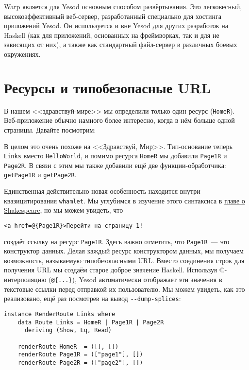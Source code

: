 Warp является для Yesod основным способом развёртывания. Это легковесный,
высокоэффективный веб-сервер, разработанный специально для хостинга приложений Yesod. Он
используется и вне Yesod для других разработок на Haskell (как для приложений, основанных
на фреймворках, так и для не зависящих от них), а также как стандартный файл-сервер в
различных боевых окружениях.

\section{Ресурсы и типобезопасные URL}

В нашем <<здравствуй-мире>> мы определили только один ресурс
(\lstinline!HomeR!). Веб-приложение обычно намного более интересно, когда в нём больше
одной страницы. Давайте посмотрим:

В целом это очень похоже на <<Здравствуй, Мир>>. Тип-основание теперь \lstinline!Links!
вместо \lstinline!HelloWorld!, и помимо ресурса \lstinline!HomeR! мы добавили
\lstinline!Page1R! и \lstinline!Page2R!. В связи с этим мы также добавили ещё две
функции-обработчика: \lstinline!getPage1R! и \lstinline!getPage2R!.

Единственная действительно новая особенность находится внутри квазицитирования
\lstinline'whamlet'. Мы углубимся в изучение этого синтаксиса в
\hyperref[chap:shakespeare]{главе о Shakespeare}, но мы можем увидеть, что
\begin{lstlisting}
<a href=@{Page1R}>Перейти на страницу 1!
\end{lstlisting}
создаёт ссылку на ресурс \lstinline!Page1R!. Здесь важно отметить, что \lstinline!Page1R!~---
это конструктор данных. Делая каждый ресурс конструктором данных, мы получаем
возможность, называемую типобезопасными URL. Вместо соединения строк для получения URL мы
создаём старое доброе значение Haskell. Используя @-интерполяцию (\lstinline!@{...}!),
Yesod автоматически отображает эти значения в текстовые ссылки перед отправкой их
пользователю. Мы можем увидеть, как это реализовано, ещё раз посмотрев на вывод
\lstinline!--dump-splices!:

\begin{lstlisting}
instance RenderRoute Links where
    data Route Links = HomeR | Page1R | Page2R
      deriving (Show, Eq, Read)

    renderRoute HomeR  = ([], [])
    renderRoute Page1R = (["page1"], [])
    renderRoute Page2R = (["page2"], [])
\end{lstlisting}

